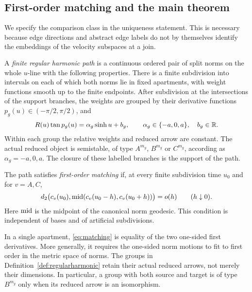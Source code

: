 \subsection{First-order matching and the main theorem}
We specify the comparison class in the uniqueness statement. This is
necessary because edge directions and abstract edge labels do not by
themselves identify the embeddings of the velocity subspaces at a join.

\begin{definition}\label{def:regularharmonic}
A \emph{finite regular harmonic path} is a continuous ordered pair of
split norms on the whole $u$-line with the following properties.
There is a finite subdivision into intervals on each of which both norms
lie in fixed apartments, with weight functions smooth up to the finite
endpoints. After subdivision at the intersections of the support branches,
the weights are grouped by their derivative functions
$p_g(u)\in(-\pi/2,\pi/2)$, and
\begin{equation}\label{eq:branch}
 R(u)\tan p_g(u)=\alpha_g\sinh u+b_g,
 \qquad \alpha_g\in\{-a,0,a\},\quad b_g\in\mathbb R.
\end{equation}
Within each group the relative weights and reduced arrow are constant.
The actual reduced object is semistable, of type $A^{m_g}$, $B^{m_g}$ or
$C^{m_g}$, according as $\alpha_g=-a,0,a$. The closure of these labelled
branches is the support of the path.

The path satisfies \emph{first-order matching} if, at every finite
subdivision time $u_0$ and for $v=A,C$,
\begin{equation}\label{eq:matching}
 d_2\bigl(c_v(u_0),\operatorname{mid}(c_v(u_0-h),c_v(u_0+h))\bigr)=o(h)
 \qquad(h\downarrow0).
\end{equation}
Here $\operatorname{mid}$ is the midpoint of the canonical norm geodesic. This
condition is independent of bases and of artificial subdivisions.
\end{definition}

In a single apartment, \eqref{eq:matching} is equality of the two
one-sided first derivatives. More generally, it requires the one-sided
norm motions to fit to first order in the metric space of norms.
The groups in Definition~\ref{def:regularharmonic} retain their actual
reduced arrows, not merely their dimensions. In particular, a group with
both source and target is of type $B^{m_g}$ only when its reduced arrow
is an isomorphism.

